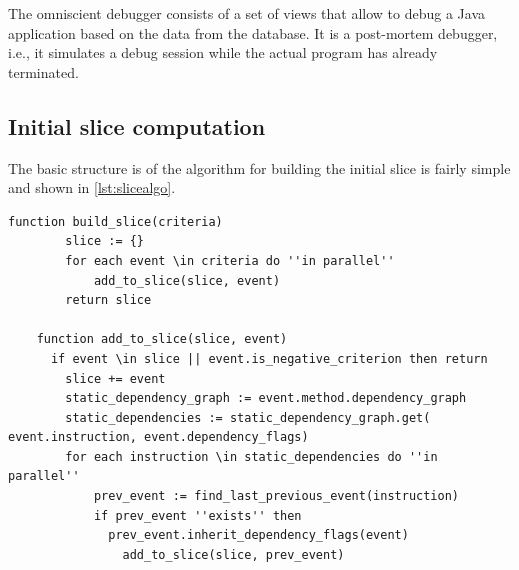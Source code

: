 ﻿\documentclass[
      english,
			conference,
      ]{IEEEtran}
\begin{document}
The omniscient debugger consists of a set of views that allow to debug a Java application based on the data from the database.
It is a post-mortem debugger, i.e., it simulates a debug session while the actual program has already terminated.

\subsection{Initial slice computation}

The basic structure is of the algorithm for building the initial slice is fairly simple and shown in \cref{lst:slicealgo}.

\begin{lstlisting}[float=t,language=algorithm,label=lst:slicealgo,caption={Simplified algorithm for building the slice}]
	function build_slice(criteria)
		slice := {}
		for each event \in criteria do ''in parallel''
			add_to_slice(slice, event)
		return slice
		
	function add_to_slice(slice, event)
	  if event \in slice || event.is_negative_criterion then return
		slice += event
		static_dependency_graph := event.method.dependency_graph
		static_dependencies := static_dependency_graph.get( event.instruction, event.dependency_flags)
		for each instruction \in static_dependencies do ''in parallel''
			prev_event := find_last_previous_event(instruction)
			if prev_event ''exists'' then
			  prev_event.inherit_dependency_flags(event)
				add_to_slice(slice, prev_event)
\end{lstlisting}


\end{document}
